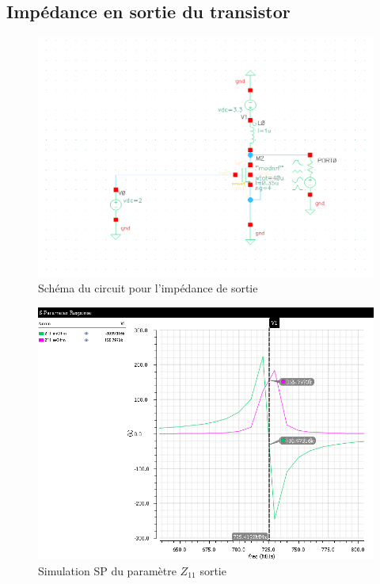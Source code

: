 \documentclass[a4paper]{article}
\begin{document}
\clearpage
\subsection{Imp\'edance en sortie du transistor}

\begin{figure}[!htb]
\begin{center}
  \includegraphics[scale=0.40]{arch-transistor-output-impedance.png}
  \caption{Sch\'ema du circuit pour l'imp\'edance de sortie}
\end{center}
\end{figure}

\begin{figure}[!htb]
\begin{center}
  \includegraphics[scale=0.40]{sim-input-impedance.png}
  \caption{Simulation SP du param\`etre $Z_11$ sortie}
\end{center}
\end{figure}
\end{document}
